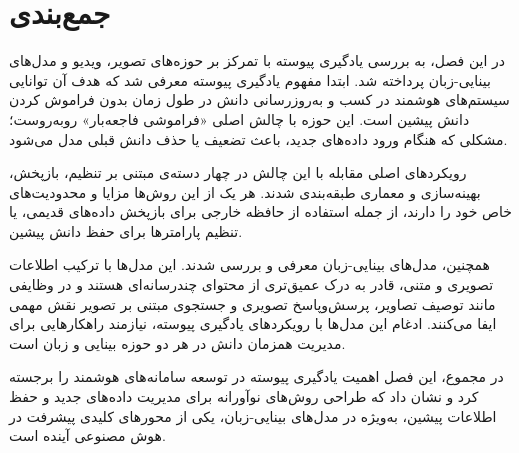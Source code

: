  
\section{جمع‌بندی}
در این فصل، به بررسی یادگیری پیوسته با تمرکز بر حوزه‌های تصویر، ویدیو و مدل‌های بینایی-زبان پرداخته شد. ابتدا مفهوم یادگیری پیوسته معرفی شد که هدف آن توانایی سیستم‌های هوشمند در کسب و به‌روزرسانی دانش در طول زمان بدون فراموش کردن دانش پیشین است. این حوزه با چالش اصلی «فراموشی فاجعه‌بار» روبه‌روست؛ مشکلی که هنگام ورود داده‌های جدید، باعث تضعیف یا حذف دانش قبلی مدل می‌شود.

رویکردهای اصلی مقابله با این چالش در چهار دسته‌ی مبتنی بر تنظیم، بازپخش، بهینه‌سازی و معماری طبقه‌بندی شدند. هر یک از این روش‌ها مزایا و محدودیت‌های خاص خود را دارند، از جمله استفاده از حافظه خارجی برای بازپخش داده‌های قدیمی، یا تنظیم پارامتر‌ها برای حفظ دانش پیشین.

همچنین، مدل‌های بینایی-زبان معرفی و بررسی شدند. این مدل‌ها با ترکیب اطلاعات تصویری و متنی، قادر به درک عمیق‌تری از محتوای چندرسانه‌ای هستند و در وظایفی مانند توصیف تصاویر، پرسش‌وپاسخ تصویری و جستجوی مبتنی بر تصویر نقش مهمی ایفا می‌کنند. ادغام این مدل‌ها با رویکردهای یادگیری پیوسته، نیازمند راهکارهایی برای مدیریت همزمان دانش در هر دو حوزه بینایی و زبان است.

در مجموع، این فصل اهمیت یادگیری پیوسته در توسعه سامانه‌های هوشمند را برجسته کرد و نشان داد که طراحی روش‌های نوآورانه برای مدیریت داده‌های جدید و حفظ اطلاعات پیشین، به‌ویژه در مدل‌های بینایی-زبان، یکی از محورهای کلیدی پیشرفت در هوش مصنوعی آینده است.
 
 
 
 
 
 
 
 
 
 
 
 
 
 
 
 
 
 
 
 
 
 
 
 
